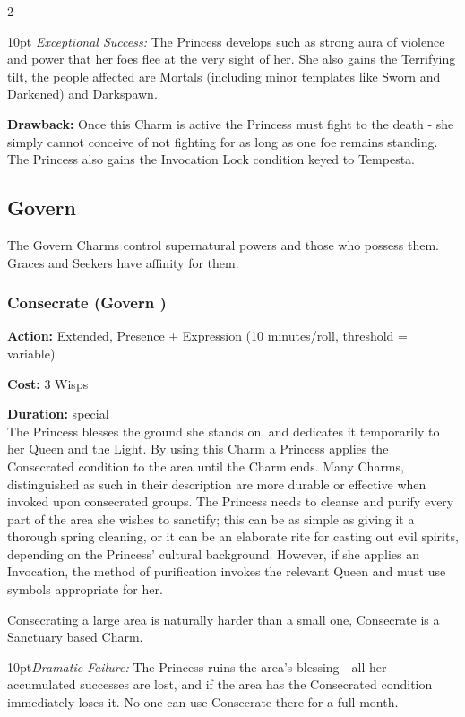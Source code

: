 \begin{multicols}{2}
\begin{myindentpar}{10pt}
    \emph{Exceptional Success:} The Princess develops such as strong aura of violence and power that her foes flee at the very sight of her. She also gains the Terrifying tilt, the people affected are Mortals (including minor templates like Sworn and Darkened) and Darkspawn.\end{myindentpar}

\textbf{Drawback:} Once this Charm is active the Princess must fight to the death - she simply cannot conceive of not fighting for as long as one foe remains standing. The Princess also gains the Invocation Lock condition keyed to Tempesta.

\subsection*{Govern}
\label{subsec:Govern}
The Govern Charms control supernatural powers and those who possess them. Graces and Seekers have affinity for them.

\subsubsection*{Consecrate (Govern \textbullet)}

\noindent \textbf{Action:} Extended, Presence + Expression (10 minutes/roll, threshold = variable)

\noindent \textbf{Cost:} 3 Wisps

\noindent \textbf{Duration:} special\\

\noindent The Princess blesses the ground she stands on, and dedicates it temporarily to her Queen and the Light. By using this Charm a Princess applies the Consecrated condition to the area until the Charm ends. Many Charms, distinguished as such in their description are more durable or effective when invoked upon consecrated groups. The Princess needs to cleanse and purify every part of the area she wishes to sanctify; this can be as simple as giving it a thorough spring cleaning, or it can be an elaborate rite for casting out evil spirits, depending on the Princess' cultural background. However, if she applies an Invocation, the method of purification invokes the relevant Queen and must use symbols appropriate for her. 

Consecrating a large area is naturally harder than a small one, Consecrate is a Sanctuary based Charm. 

    \begin{myindentpar}{10pt}\emph{Dramatic Failure:} The Princess ruins the area's blessing - all her accumulated successes are lost, and if the area has the Consecrated  condition immediately loses it. No one can use Consecrate there for a full month.


\end{myindentpar}
\end{multicols}
